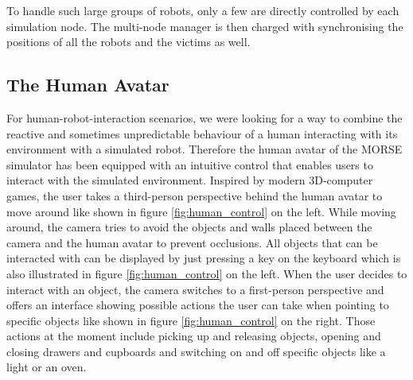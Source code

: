 \documentclass{llncs}
\begin{document}
To handle such large groups of robots, only a few are directly controlled by
each simulation node. The multi-node manager is then charged with synchronising
the positions of all the robots and the victims as well.




\subsection{The Human Avatar}
\label{section:human}

For human-robot-interaction scenarios, we were looking for a way to combine the
reactive and sometimes unpredictable behaviour of a human interacting with its
environment with a simulated robot. Therefore the human avatar of the MORSE
simulator has been equipped with an intuitive 
control that enables users to interact with the simulated environment. Inspired
by modern 3D-computer games, the user takes a third-person perspective behind
the human avatar to move around like shown in figure \ref{fig:human_control} on
the left. 
While moving around, the camera tries to avoid the objects and walls placed
between the camera and the human avatar to prevent occlusions.  All objects
that can be interacted with can be displayed by just pressing a key on the
keyboard which is also illustrated in figure \ref{fig:human_control} on the
left. When the user decides to interact with an object, the camera switches to
a first-person perspective and offers an interface showing possible actions the
user can take when pointing to specific objects like shown in figure
\ref{fig:human_control} on the right. Those actions at the moment include
picking up and releasing objects, opening and closing drawers and cupboards and
switching on and off specific objects like a light or an oven. 
\end{document}
